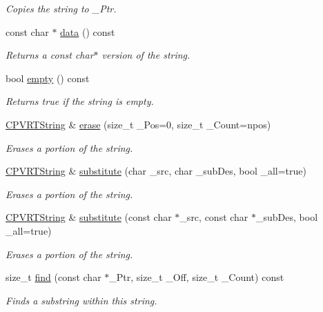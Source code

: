 \begin{DoxyCompactItemize}
\begin{DoxyCompactList}\small\item\em Copies the string to \+\_\+\+Ptr. \end{DoxyCompactList}\item 
const char $\ast$ \hyperlink{class_c_p_v_r_t_string_a63d9aaa536816ddc51fa4e6f7dae9e56}{data} () const 
\begin{DoxyCompactList}\small\item\em Returns a const char$\ast$ version of the string. \end{DoxyCompactList}\item 
bool \hyperlink{class_c_p_v_r_t_string_ad840a73b6d6ace02ca50d14680f38439}{empty} () const 
\begin{DoxyCompactList}\small\item\em Returns true if the string is empty. \end{DoxyCompactList}\item 
\hyperlink{class_c_p_v_r_t_string}{C\+P\+V\+R\+T\+String} \& \hyperlink{class_c_p_v_r_t_string_a224598bca261851e6b56eacf8dddb51e}{erase} (size\+\_\+t \+\_\+\+Pos=0, size\+\_\+t \+\_\+\+Count=npos)
\begin{DoxyCompactList}\small\item\em Erases a portion of the string. \end{DoxyCompactList}\item 
\hyperlink{class_c_p_v_r_t_string}{C\+P\+V\+R\+T\+String} \& \hyperlink{class_c_p_v_r_t_string_afaca43fa31548dcae05b2cba65406379}{substitute} (char \+\_\+src, char \+\_\+sub\+Des, bool \+\_\+all=true)
\begin{DoxyCompactList}\small\item\em Erases a portion of the string. \end{DoxyCompactList}\item 
\hyperlink{class_c_p_v_r_t_string}{C\+P\+V\+R\+T\+String} \& \hyperlink{class_c_p_v_r_t_string_ab6b191f6e48bb43af236460389fb3375}{substitute} (const char $\ast$\+\_\+src, const char $\ast$\+\_\+sub\+Des, bool \+\_\+all=true)
\begin{DoxyCompactList}\small\item\em Erases a portion of the string. \end{DoxyCompactList}\item 
size\+\_\+t \hyperlink{class_c_p_v_r_t_string_a5ebc83257276abc56a7d46522dc56bba}{find} (const char $\ast$\+\_\+\+Ptr, size\+\_\+t \+\_\+\+Off, size\+\_\+t \+\_\+\+Count) const 
\begin{DoxyCompactList}\small\item\em Finds a substring within this string. \end{DoxyCompactList}\item 

\end{DoxyCompactItemize}
